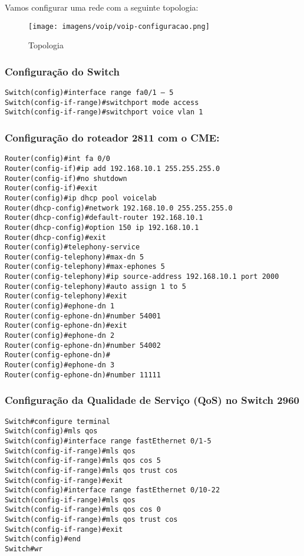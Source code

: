 \documentclass[]{article}
\begin{document}
Vamos configurar uma rede com a seguinte topologia:

\begin{figure}[htbp]
\centering
\texttt{[image: imagens/voip/voip-configuracao.png]}
\caption{Topologia}
\end{figure}

\subsubsection{Configuração do
Switch}\label{configurauxe7uxe3o-do-switch}

\begin{verbatim}
Switch(config)#interface range fa0/1 – 5
Switch(config-if-range)#switchport mode access
Switch(config-if-range)#switchport voice vlan 1
\end{verbatim}

\subsubsection{Configuração do roteador 2811 com o
CME:}\label{configurauxe7uxe3o-do-roteador-2811-com-o-cme}

\begin{verbatim}
Router(config)#int fa 0/0
Router(config-if)#ip add 192.168.10.1 255.255.255.0
Router(config-if)#no shutdown
Router(config-if)#exit
Router(config)#ip dhcp pool voicelab
Router(dhcp-config)#network 192.168.10.0 255.255.255.0
Router(dhcp-config)#default-router 192.168.10.1
Router(dhcp-config)#option 150 ip 192.168.10.1
Router(dhcp-config)#exit
Router(config)#telephony-service
Router(config-telephony)#max-dn 5
Router(config-telephony)#max-ephones 5
Router(config-telephony)#ip source-address 192.168.10.1 port 2000
Router(config-telephony)#auto assign 1 to 5
Router(config-telephony)#exit
Router(config)#ephone-dn 1
Router(config-ephone-dn)#number 54001
Router(config-ephone-dn)#exit
Router(config)#ephone-dn 2
Router(config-ephone-dn)#number 54002
Router(config-ephone-dn)#
Router(config)#ephone-dn 3
Router(config-ephone-dn)#number 11111
\end{verbatim}

\subsubsection{Configuração da Qualidade de Serviço (QoS) no Switch
2960}\label{configurauxe7uxe3o-da-qualidade-de-serviuxe7o-qos-no-switch-2960}

\begin{verbatim}
Switch#configure terminal
Switch(config)#mls qos
Switch(config)#interface range fastEthernet 0/1-5
Switch(config-if-range)#mls qos
Switch(config-if-range)#mls qos cos 5
Switch(config-if-range)#mls qos trust cos
Switch(config-if-range)#exit
Switch(config)#interface range fastEthernet 0/10-22
Switch(config-if-range)#mls qos
Switch(config-if-range)#mls qos cos 0
Switch(config-if-range)#mls qos trust cos
Switch(config-if-range)#exit
Switch(config)#end
Switch#wr
\end{verbatim}
\end{document}
